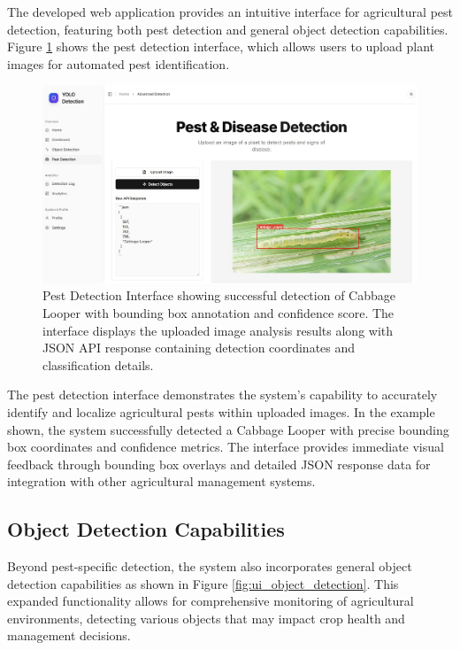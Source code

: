 \documentclass[conference]{IEEEtran}
\begin{document}
The developed web application provides an intuitive interface for agricultural pest detection, featuring both pest detection and general object detection capabilities. Figure \ref{fig:ui_pest_detection} shows the pest detection interface, which allows users to upload plant images for automated pest identification.

\begin{figure}[htbp]
\centerline{\includegraphics[width=\columnwidth]{ui_pest_detection.png}}
\caption{Pest Detection Interface showing successful detection of Cabbage Looper with bounding box annotation and confidence score. The interface displays the uploaded image analysis results along with JSON API response containing detection coordinates and classification details.}
\label{fig:ui_pest_detection}
\end{figure}

The pest detection interface demonstrates the system's capability to accurately identify and localize agricultural pests within uploaded images. In the example shown, the system successfully detected a Cabbage Looper with precise bounding box coordinates and confidence metrics. The interface provides immediate visual feedback through bounding box overlays and detailed JSON response data for integration with other agricultural management systems.

\subsection{Object Detection Capabilities}

Beyond pest-specific detection, the system also incorporates general object detection capabilities as shown in Figure \ref{fig:ui_object_detection}. This expanded functionality allows for comprehensive monitoring of agricultural environments, detecting various objects that may impact crop health and management decisions.
\end{document}
